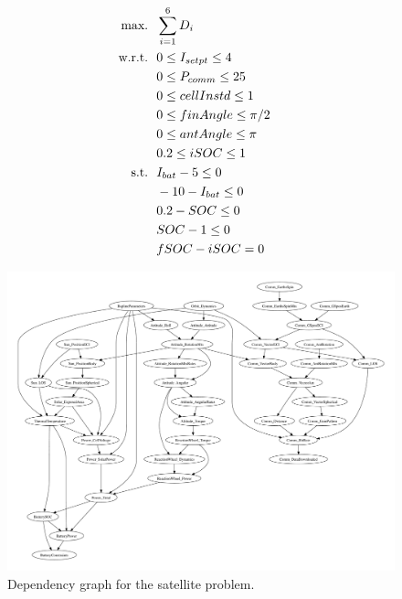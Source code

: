 \documentclass[]{aiaa-tc} %
\newcommand{\txt}{\textrm}
\begin{document}
        \begin{align}
            \\\txt{max.} &\ \ \sum_{i=1}^6 D_i \notag
            \\\txt{w.r.t.} & \ \ 0 \le I_{setpt} \le 4 \notag
            \\     & \ \ 0 \le P_{comm} \le 25 \notag
            \\     & \ \ 0 \le cellInstd \le 1 \notag
            \\     & \ \ 0 \le finAngle \le \pi/2 \notag
            \\     & \ \ 0 \le antAngle \le \pi \notag
            \\     & \ \ 0.2 \le iSOC \le 1 \notag
            \\\txt{s.t.} & \ \ I_{bat} - 5 \le 0 \notag
            \\     & \ \ -10 - I_{bat} \le 0 \notag
            \\     & \ \ 0.2 - SOC \le 0 \notag
            \\     & \ \ SOC - 1 \le 0 \notag
            \\     & \ \ fSOC - iSOC = 0 \notag
            \label{eqn:sellar_formulation}
        \end{align}


        \begin{figure}[!htb]\begin{center}
          \includegraphics[width=1.1\textwidth]{images/CADRE.pdf}
          \caption{ Dependency graph for the satellite problem. \label{fig:cadre_graph}}
        \end{center}\end{figure}
\end{document}
